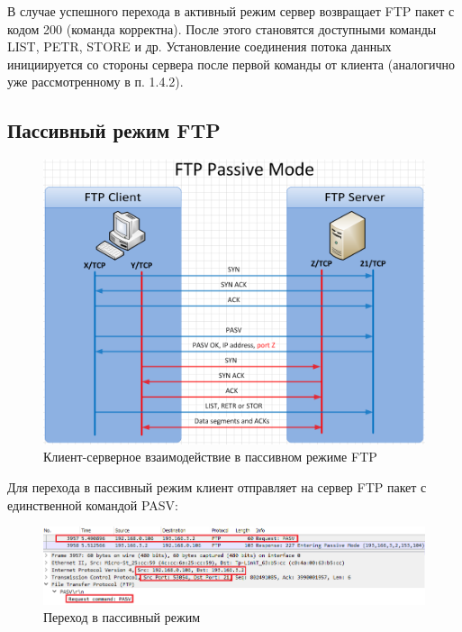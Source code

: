 \documentclass[14pt,a4paper,report]{report}
\begin{document}
В случае успешного перехода в активный режим сервер возвращает FTP пакет с кодом 200 (команда корректна). После этого становятся доступными команды LIST, PETR, STORE и др. Установление соединения потока данных инициируется со стороны сервера после первой команды от клиента (аналогично уже рассмотренному в п. 1.4.2).

\subsection{Пассивный режим FTP}

\begin{figure}[h!]
	\centering
	\includegraphics[scale = 0.44]{images/scheme_ftp_passive.png}
	
	\caption{Клиент-серверное взаимодействие в пассивном режиме FTP}
	\label{image:10}
\end{figure}

Для перехода в пассивный режим клиент отправляет на сервер FTP пакет с единственной командой PASV:

\begin{figure}[h!]
	\centering
	\includegraphics[scale = 0.73]{images/ftp8.png}
	
	\caption{Переход в пассивный режим}
	\label{image:11}
\end{figure}
\end{document}
